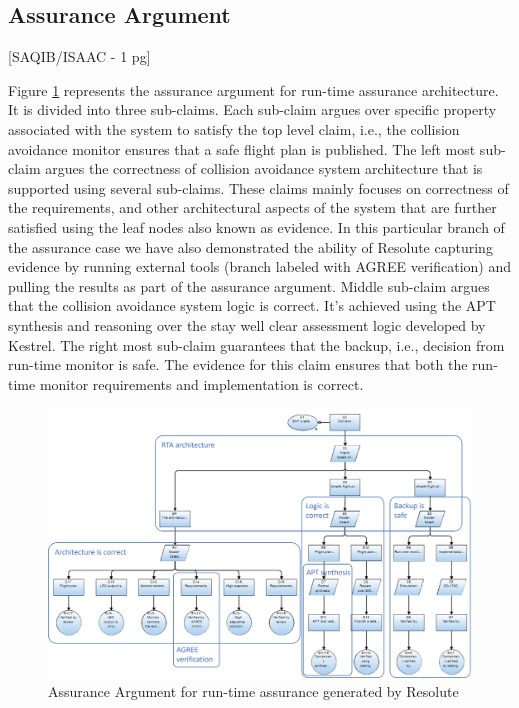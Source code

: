 \subsection{Assurance Argument}

[SAQIB/ISAAC - 1 pg]

Figure \ref{fig:rta-resolute} represents the assurance argument for run-time assurance architecture. It is divided into three sub-claims. Each sub-claim argues over specific property associated with the system to satisfy the top level claim, i.e., the collision avoidance monitor ensures that a safe flight plan is published. The left most sub-claim argues the correctness of  collision avoidance system architecture that is supported using several sub-claims. These claims mainly focuses on correctness of the requirements, and other architectural aspects of the system that are further satisfied using the leaf nodes also known as evidence. In this particular branch of the assurance case we have also demonstrated the ability of Resolute capturing evidence by running external tools (branch labeled with AGREE verification) and pulling the results as part of the assurance argument. Middle sub-claim argues that the collision avoidance system logic is correct. It's achieved using the APT synthesis and reasoning over the stay well clear assessment logic developed by Kestrel. The right most sub-claim guarantees that the backup, i.e., decision from run-time monitor is safe. The evidence for this claim ensures that both the run-time monitor requirements and implementation is correct. 


\begin{figure}
	\centering
	\includegraphics[width=\textwidth]{figures/rta-resolute.jpg}
	\caption{Assurance Argument for run-time assurance generated by Resolute}
	\label{fig:rta-resolute}
\end{figure}
